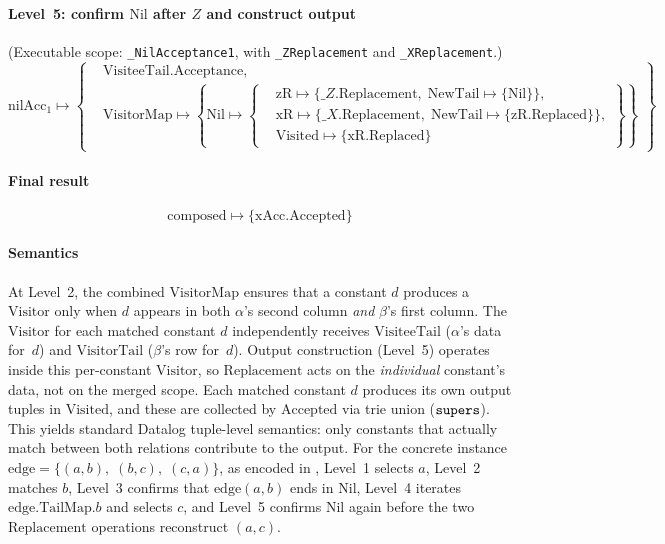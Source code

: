 \paragraph{Level~5: confirm $\mathrm{Nil}$ after $Z$ and construct output}
(Executable scope: \texttt{\_NilAcceptance1}, with
\texttt{\_ZReplacement} and \texttt{\_XReplacement}.)
{\small
  \[
    \mathrm{nilAcc}_1 \mapsto \left\{
      \begin{aligned}
        &\mathrm{VisiteeTail}.\mathrm{Acceptance},\\
        &\mathrm{VisitorMap} \mapsto \left\{\mathrm{Nil} \mapsto \left\{
            \begin{aligned}
              &\mathrm{zR} \mapsto \{\_Z.\mathrm{Replacement},\; \mathrm{NewTail} \mapsto \{\mathrm{Nil}\}\},\\
              &\mathrm{xR} \mapsto \{\_X.\mathrm{Replacement},\; \mathrm{NewTail} \mapsto \{\mathrm{zR}.\mathrm{Replaced}\}\},\\
              &\mathrm{Visited} \mapsto \{\mathrm{xR}.\mathrm{Replaced}\}
        \end{aligned}\right\}\right\}
    \end{aligned}\right\}
\]}

\paragraph{Final result}
\[
  \mathrm{composed} \mapsto \{\mathrm{xAcc}.\mathrm{Accepted}\}
\]

\paragraph{Semantics}
At Level~2, the combined $\mathrm{VisitorMap}$ ensures that a
constant $d$ produces a $\mathrm{Visitor}$ only when $d$
appears in both $\alpha$'s second column \emph{and}
$\beta$'s first column.
The $\mathrm{Visitor}$ for each matched constant $d$
independently receives $\mathrm{VisiteeTail}$ ($\alpha$'s
data for~$d$) and $\mathrm{VisitorTail}$ ($\beta$'s row
for~$d$).
Output construction (Level~5) operates inside this
per-constant $\mathrm{Visitor}$, so $\mathrm{Replacement}$
acts on the \emph{individual} constant's data, not on the
merged scope.
Each matched constant $d$ produces its own output tuples
in $\mathrm{Visited}$, and these are collected by
$\mathrm{Accepted}$ via trie union ($\mathtt{supers}$).
This yields standard Datalog tuple-level semantics: only
constants that actually match between both relations
contribute to the output.
For the concrete instance
$\mathrm{edge} = \{(a,b),\; (b,c),\; (c,a)\}$, as encoded in
,
Level~1 selects $a$, Level~2 matches $b$, Level~3 confirms
that $\mathrm{edge}(a,b)$ ends in $\mathrm{Nil}$, Level~4
iterates $\mathrm{edge}.\mathrm{TailMap}.b$ and selects $c$,
and Level~5 confirms $\mathrm{Nil}$ again before the two
$\mathrm{Replacement}$ operations reconstruct $(a,c)$.

